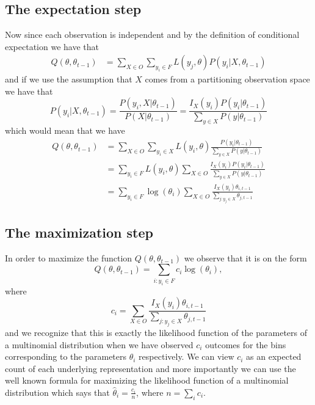 \subsection{The expectation step}
Now since each observation is independent and by the definition of conditional expectation we have that 
\begin{equation*}
\begin{split}
Q(\theta,\theta_{t-1})%
&= \sum_{X\in O} \sum_{y_i \in F} L(y_j,\theta)P(y_i|X,\theta_{t-1})
\end{split}
\end{equation*}
and if we use the assumption that $X$ comes from a partitioning observation space we have that 
\begin{equation*}
P(y_i|X,\theta_{t-1}) = \frac{P(y_i,X|\theta_{t-1})}{P(X|\theta_{t-1})} =\frac{I_X(y_i)P(y_i|\theta_{t-1})}{\sum_{y\in X} P(y|\theta_{t-1})}
\end{equation*}
which would mean that we have
\begin{equation*}
\begin{split}
Q(\theta, \theta_{t-1}) &= \sum_{X\in O} \sum_{y_i \in X} L(y_i,\theta) \frac{P(y_i|\theta_{t-1})}{\sum_{y\in X} P(y|\theta_{t-1})}\\
&=  \sum_{y_i \in F}L(y_i,\theta)\sum_{X\in O}  \frac{I_X(y_i)P(y_i|\theta_{t-1})}{\sum_{y\in X} P(y|\theta_{t-1})}\\
&=  \sum_{y_i \in F}\log (\theta_i)\sum_{X\in O}  \frac{I_X(y_i)\theta_{i, t-1}}{\sum_{j:y_j\in X} \theta_{j,t-1}}
\end{split}
\end{equation*}
\subsection{The maximization step}
In order to maximize the function $Q(\theta, \theta_{t-1})$ we observe that it is on the form
\begin{equation*}
Q(\theta, \theta_{t-1}) = \sum_{i: y_i\in F}c_i\log (\theta_i),
\end{equation*}
where
\begin{equation}
\label{pseudocounts}
c_i=\sum_{X\in O}  \frac{I_X(y_i)\theta_{i, t-1}}{\sum_{j:y_j\in X} \theta_{j,t-1}}
\end{equation}
and we recognize that this is exactly the likelihood function of the parameters of a multinomial distribution when we have observed $c_i$ outcomes for the bins corresponding to the parameters $\theta_i$ respectively. We can view $c_i$ as an expected count of each underlying representation and more importantly we can use the well known formula for maximizing the likelihood function of a multinomial distribution which says that $\hat \theta_i = \frac{c_i}{n}$, where $n=\sum_i c_i$.
